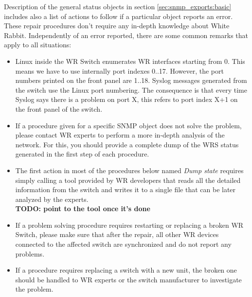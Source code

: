 Description of the general status objects in section
\ref{sec:snmp_exports:basic} includes also a list of actions to follow if a
particular object reports an error. These repair procedures don't require any
in-depth knowledge about White Rabbit. Independently of an error reported, there
are some common remarks that apply to all situations:
\begin{itemize}
  \item Linux inside the WR Switch enumerates WR interfaces starting from 0.
    This means we have to use internally port indexes 0..17. However, the
    port numbers printed on the front panel are 1..18. Syslog messages
    generated from the switch use the Linux port numbering. The consequence is
    that every time Syslog says there is a problem on port X, this refers to
    port index X+1 on the front panel of the switch.
  \item If a procedure given for a specific SNMP object does not solve the
    problem, please contact WR experts to perform a more in-depth analysis of
    the network. For this, you should provide a complete dump of the WRS status
    generated in the first step of each procedure.
  \item The first action in most of the procedures below named \emph{Dump state}
    requires simply calling a tool provided by WR developers that reads all the
    detailed information from the switch and writes it to a single file that can
    be later analyzed by the experts.\\
    {\bf TODO: point to the tool once it's done}
  \item If a problem solving procedure requires restarting or replacing a broken
    WR Switch, please make sure that after the repair, all other WR devices
    connected to the affected switch are synchronized and do not report any
    problems.
  \item If a procedure requires replacing a switch with a new unit, the broken
    one should be handled to WR experts or the switch manufacturer to
    investigate the problem.
\end{itemize}

